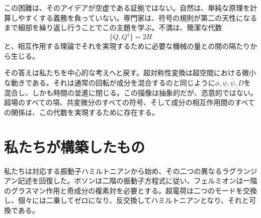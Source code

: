 この困難は、そのアイデアが空虚である証拠ではない。自然は、単純な原理を計算しやすくする義務を負っていない。専門家は、符号の規則が第二の天性になるまで細部を繰り返し行うことでこの主題を学ぶ。不満は、簡潔な代数
\begin{equation}
\{Q,Q^\dagger\}=2H
\end{equation}
と、相互作用する理論でそれを実現するために必要な機械の量との間の隔たりから生じる。

\begin{classroomqa}
\end{classroomqa}

\begin{classroomqa}
\end{classroomqa}

その答えは私たちを中心的な考えへと戻す。超対称性変換は超空間における微小な動きである。それは通常の回転が成分を混合するのと同じように\(\phi,\psi,\bar\psi,D\)を混合し、しかも時間の並進に閉じる。この描像は抽象的だが、恣意的ではない。超場のすべての項、共変微分のすべての符号、そして成分の相互作用間のすべての関係は、この代数を実現するために存在する。

\section{私たちが構築したもの}

私たちは対応する振動子ハミルトニアンから始め、その二つの異なるラグランジアン記述を回復した。ボソンは二階の振動子方程式に従い、フェルミオンは一階のグラスマン作用と奇成分の複素対を必要とする。超電荷は二つのモードを交換し、個々には二乗してゼロになり、反交換してハミルトニアンとなり、それと可換である。

